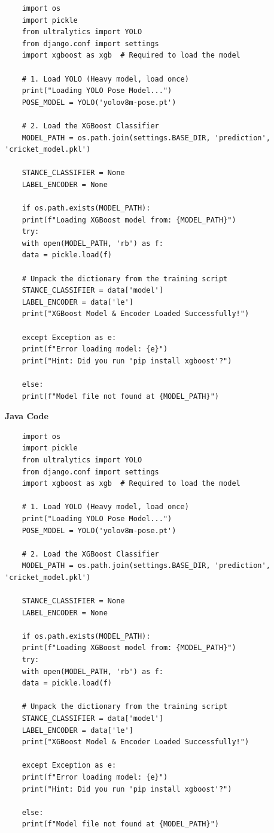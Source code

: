\begin{lstlisting}
	import os
	import pickle
	from ultralytics import YOLO
	from django.conf import settings
	import xgboost as xgb  # Required to load the model
	
	# 1. Load YOLO (Heavy model, load once)
	print("Loading YOLO Pose Model...")
	POSE_MODEL = YOLO('yolov8m-pose.pt')
	
	# 2. Load the XGBoost Classifier
	MODEL_PATH = os.path.join(settings.BASE_DIR, 'prediction', 'cricket_model.pkl')
	
	STANCE_CLASSIFIER = None
	LABEL_ENCODER = None
	
	if os.path.exists(MODEL_PATH):
	print(f"Loading XGBoost model from: {MODEL_PATH}")
	try:
	with open(MODEL_PATH, 'rb') as f:
	data = pickle.load(f)
	
	# Unpack the dictionary from the training script
	STANCE_CLASSIFIER = data['model']
	LABEL_ENCODER = data['le']
	print("XGBoost Model & Encoder Loaded Successfully!")
	
	except Exception as e:
	print(f"Error loading model: {e}")
	print("Hint: Did you run 'pip install xgboost'?")
	
	else:
	print(f"Model file not found at {MODEL_PATH}")
\end{lstlisting}
\textbf{Java Code}
\begin{lstlisting}
	import os
	import pickle
	from ultralytics import YOLO
	from django.conf import settings
	import xgboost as xgb  # Required to load the model
	
	# 1. Load YOLO (Heavy model, load once)
	print("Loading YOLO Pose Model...")
	POSE_MODEL = YOLO('yolov8m-pose.pt')
	
	# 2. Load the XGBoost Classifier
	MODEL_PATH = os.path.join(settings.BASE_DIR, 'prediction', 'cricket_model.pkl')
	
	STANCE_CLASSIFIER = None
	LABEL_ENCODER = None
	
	if os.path.exists(MODEL_PATH):
	print(f"Loading XGBoost model from: {MODEL_PATH}")
	try:
	with open(MODEL_PATH, 'rb') as f:
	data = pickle.load(f)
	
	# Unpack the dictionary from the training script
	STANCE_CLASSIFIER = data['model']
	LABEL_ENCODER = data['le']
	print("XGBoost Model & Encoder Loaded Successfully!")
	
	except Exception as e:
	print(f"Error loading model: {e}")
	print("Hint: Did you run 'pip install xgboost'?")
	
	else:
	print(f"Model file not found at {MODEL_PATH}")
\end{lstlisting}

